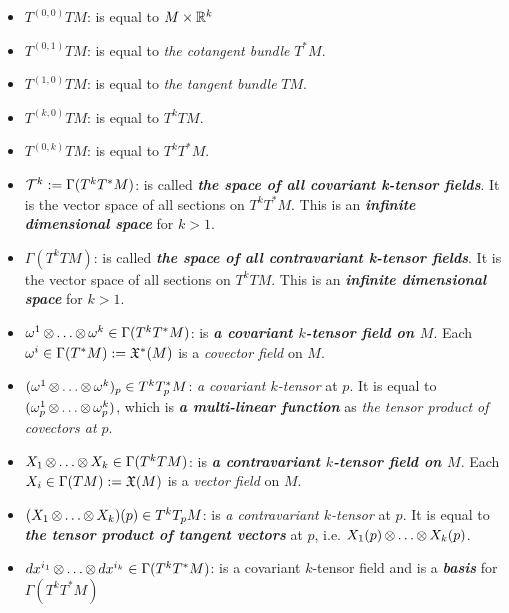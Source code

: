\documentclass[11pt]{article}
\begin{document}
\begin{itemize}
\item $T^{(0,0)}TM$: \quad is equal to $M \times {\mathbb R}^{k}$

\item $T^{(0,1)}TM$: \quad is equal to \emph{the cotangent bundle} $T^{*}M$.

\item $T^{(1,0)}TM$: \quad is equal to \emph{the tangent bundle} $TM$.

\item $T^{(k,0)}TM$: \quad is equal to $T^{k}TM$.

\item $T^{(0,k)}TM$: \quad is equal to $T^{k}T^{*}M$.

\item ${\mathcal T}^{k}:=\Gamma(T^{k}T^{*}M)$: \quad is called \emph{\textbf{the space of all covariant k-tensor fields}}.  It is the vector space of all sections on $T^{k}T^{*}M$.  This is an \emph{\textbf{infinite dimensional space}} for $k > 1$.

\item $\Gamma(T^{k}TM)$: \quad is called \emph{\textbf{the space of all contravariant k-tensor fields}}.  It is the vector space of all sections on $T^{k}TM$.  This is an \emph{\textbf{infinite dimensional space}} for $k > 1$.

\item $\omega^1 \,{\otimes}\ldots{\otimes}\, \omega^k \in \Gamma(T^{k}T^{*}M)$: \quad is \emph{\textbf{a covariant $k$-tensor field on $M$}}. Each $\omega^i \in \Gamma(T^{*}M):= {\mathfrak X}^{*}(M)$ is a \emph{covector field} on $M$.

\item $(\omega^1 \,{\otimes}\ldots{\otimes}\, \omega^k)_p \in T^{k}T_p^{*}M$: \quad \emph{a covariant $k$-tensor} at $p$. It is equal to $(\omega_p^1 \,{\otimes}\ldots{\otimes}\, \omega_p^k)$, which is \emph{\textbf{a multi-linear function}} as \emph{the tensor product of covectors at $p$}.

\item $X_1 \,{\otimes}\ldots{\otimes}\, X_k \in \Gamma(T^{k}TM)$: \quad is \emph{\textbf{a contravariant $k$-tensor field on $M$}}. Each $X_i \in \Gamma(TM) := {\mathfrak X}(M)$ is a \emph{vector field} on $M$.

\item $(X_1 \,{\otimes}\ldots{\otimes}\, X_k)(p) \in T^{k}T_pM$: \quad is \emph{a contravariant $k$-tensor} at $p$. It is equal to \emph{\textbf{the tensor product of tangent vectors}} at $p$, i.e.  $X_1(p) \,{\otimes}\ldots{\otimes}\, X_k(p)$.

\item $dx^{i_1} \,{\otimes}\ldots{\otimes}\, dx^{i_k}  \in \Gamma(T^{k}T^{*}M)$: \quad is a covariant $k$-tensor field and is a \emph{\textbf{basis}} for $\Gamma(T^{k}T^{*}M)$


\end{itemize}
\end{document}
